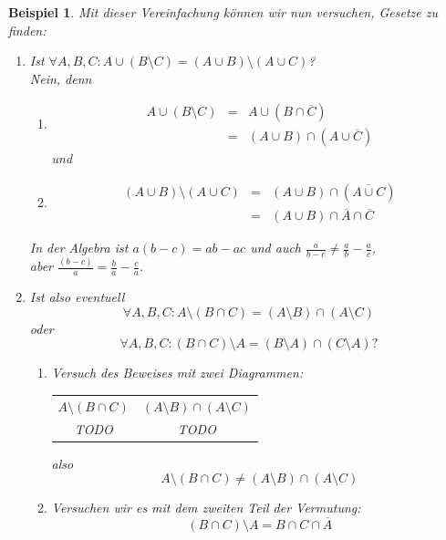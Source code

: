 \documentclass{report}
\newtheorem{myexample}{Beispiel}
\begin{document}
\begin{myexample}Mit dieser Vereinfachung können wir nun versuchen, Gesetze zu finden:
\begin{enumerate}\item Ist $\forall A,B,C : A \cup (B \setminus C) = (A \cup B) \setminus (A \cup C)$?\\
Nein, denn
\begin{enumerate}\item \begin{eqnarray}A \cup (B \setminus C) & = & A \cup (B \cap \overline{C})\\ \nonumber
& = & (A \cup B) \cap (A \cup \overline{C})\end{eqnarray}
und
\item\begin{eqnarray}(A \cup B) \setminus (A \cup C) & = & (A \cup B) \cap (\overline{A \cup C}) \\ \nonumber
& = & (A \cup B) \cap \overline{A} \cap \overline{C}\end{eqnarray}
\end{enumerate}
In der Algebra ist $a(b-c) = ab-ac$ und auch $\frac{a}{b-c} \neq \frac{a}{b} - \frac{a}{c}$, 
\\
aber $\frac{(b-c)}{a} = \frac{b}{a} - \frac{c}{a}$.
\item Ist also eventuell
\begin{equation}\forall A,B,C : A \setminus (B \cap C) = (A \setminus B) \cap (A \setminus C)\end{equation}
oder
\begin{equation}\forall A,B,C : (B \cap C) \setminus A = (B \setminus A) \cap (C \setminus A)\mbox{?}\end{equation}
\begin{enumerate}\item Versuch des Beweises mit zwei Diagrammen:
\begin{center}\begin{tabular}{c c}
$A \setminus (B \cap C)$ & $(A \setminus B) \cap (A \setminus C)$ \\
TODO & TODO\end{tabular}\end{center}
also
\begin{equation}A \setminus (B \cap C) \neq (A \setminus B) \cap (A \setminus C)\end{equation}
\item Versuchen wir es mit dem zweiten Teil der Vermutung:\begin{equation}(B \cap C) \setminus A = B \cap C \cap \overline{A}\end{equation}

\end{enumerate}
\end{enumerate}
\end{myexample}
\end{document}
